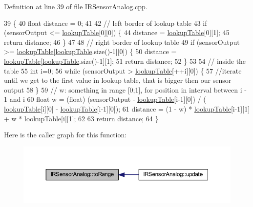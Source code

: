 Definition at line 39 of file I\+R\+Sensor\+Analog.\+cpp.


\begin{DoxyCode}
39                                                 \{
40     \textcolor{keywordtype}{float} distance = 0;
41 
42     \textcolor{comment}{// left border of lookup table}
43     \textcolor{keywordflow}{if} (sensorOutput <= \hyperlink{class_i_r_sensor_analog_a981d91e0de8f658d5c15ac5bfbe8ed6c}{lookupTable}[0][0]) \{
44         distance = \hyperlink{class_i_r_sensor_analog_a981d91e0de8f658d5c15ac5bfbe8ed6c}{lookupTable}[0][1];
45         \textcolor{keywordflow}{return} distance;
46     \}
47 
48     \textcolor{comment}{// right border of lookup table}
49     \textcolor{keywordflow}{if} (sensorOutput >= \hyperlink{class_i_r_sensor_analog_a981d91e0de8f658d5c15ac5bfbe8ed6c}{lookupTable}[\hyperlink{class_i_r_sensor_analog_a981d91e0de8f658d5c15ac5bfbe8ed6c}{lookupTable}.size()-1][0]) \{
50         distance = \hyperlink{class_i_r_sensor_analog_a981d91e0de8f658d5c15ac5bfbe8ed6c}{lookupTable}[\hyperlink{class_i_r_sensor_analog_a981d91e0de8f658d5c15ac5bfbe8ed6c}{lookupTable}.size()-1][1];
51         \textcolor{keywordflow}{return} distance;
52     \}
53 
54     \textcolor{comment}{// inside the table}
55     \textcolor{keywordtype}{int} i=0;
56     \textcolor{keywordflow}{while} (sensorOutput > \hyperlink{class_i_r_sensor_analog_a981d91e0de8f658d5c15ac5bfbe8ed6c}{lookupTable}[++i][0]) \{
57         \textcolor{comment}{//iterate until we get to the first value in lookup table, that is bigger then our sensor output}
58     \}
59     \textcolor{comment}{// w: something in range [0;1], for position in interval between i - 1 and i}
60     \textcolor{keywordtype}{float} w = (float) (sensorOutput - \hyperlink{class_i_r_sensor_analog_a981d91e0de8f658d5c15ac5bfbe8ed6c}{lookupTable}[i-1][0]) / (
      \hyperlink{class_i_r_sensor_analog_a981d91e0de8f658d5c15ac5bfbe8ed6c}{lookupTable}[i][0] - \hyperlink{class_i_r_sensor_analog_a981d91e0de8f658d5c15ac5bfbe8ed6c}{lookupTable}[i-1][0]);
61     distance = (1 - w) * \hyperlink{class_i_r_sensor_analog_a981d91e0de8f658d5c15ac5bfbe8ed6c}{lookupTable}[i-1][1] + w * \hyperlink{class_i_r_sensor_analog_a981d91e0de8f658d5c15ac5bfbe8ed6c}{lookupTable}[i][1];
62 
63     \textcolor{keywordflow}{return} distance;
64 \}
\end{DoxyCode}
Here is the caller graph for this function\+:\nopagebreak
\begin{figure}[H]
\begin{center}
\leavevmode
\includegraphics[width=350pt]{class_i_r_sensor_analog_a33ed6c82b3cb6720bfdd6f7598c54699_icgraph}
\end{center}
\end{figure}
